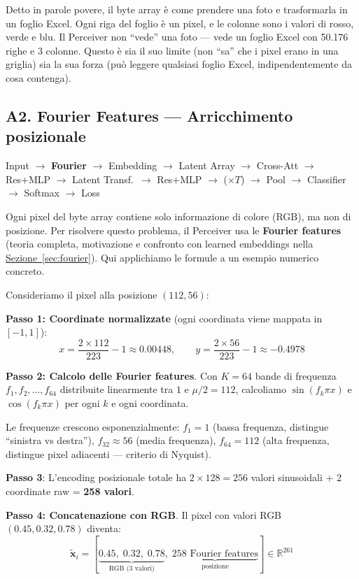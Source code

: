 \documentclass[12pt,a4paper]{article}
\begin{document}
\begin{notabox}
Detto in parole povere, il byte array \`e come prendere una foto e trasformarla in un foglio Excel. Ogni riga del foglio \`e un pixel, e le colonne sono i valori di rosso, verde e blu. Il Perceiver non ``vede'' una foto --- vede un foglio Excel con 50.176 righe e 3 colonne. Questo \`e sia il suo limite (non ``sa'' che i pixel erano in una griglia) sia la sua forza (pu\`o leggere qualsiasi foglio Excel, indipendentemente da cosa contenga).
\end{notabox}


\subsection{A2. Fourier Features --- Arricchimento posizionale} \label{sec:fourier_forward}

\begin{pipelinebox}
Input $\to$ \textbf{Fourier} $\to$ Embedding $\to$ Latent Array $\to$ Cross-Att $\to$ Res+MLP $\to$ Latent Transf.\ $\to$ Res+MLP $\to$ ($\times T$) $\to$ Pool $\to$ Classifier $\to$ Softmax $\to$ Loss
\end{pipelinebox}

Ogni pixel del byte array contiene solo informazione di colore (RGB), ma non di posizione. Per risolvere questo problema, il Perceiver usa le \textbf{Fourier features} (teoria completa, motivazione e confronto con learned embeddings nella \hyperref[sec:fourier]{Sezione~\ref*{sec:fourier}}). Qui applichiamo le formule a un esempio numerico concreto.

\begin{examplebox}
Consideriamo il pixel alla posizione $(112, 56)$:

\textbf{Passo 1: Coordinate normalizzate} (ogni coordinata viene mappata in $[-1, 1]$):
\[
    x = \frac{2 \times 112}{223} - 1 \approx 0.00448, \qquad y = \frac{2 \times 56}{223} - 1 \approx -0.4978
\]

\textbf{Passo 2: Calcolo delle Fourier features}. Con $K = 64$ bande di frequenza $f_1, f_2, \ldots, f_{64}$ distribuite linearmente tra $1$ e $\mu/2 = 112$, calcoliamo $\sin(f_k \pi x)$ e $\cos(f_k \pi x)$ per ogni $k$ e ogni coordinata.

Le frequenze crescono esponenzialmente: $f_1 = 1$ (bassa frequenza, distingue ``sinistra vs destra''), $f_{32} \approx 56$ (media frequenza), $f_{64} = 112$ (alta frequenza, distingue pixel adiacenti --- criterio di Nyquist).

\textbf{Passo 3}: L'encoding posizionale totale ha $2 \times 128 = 256$ valori sinusoidali + 2 coordinate raw = \textbf{258 valori}.

\textbf{Passo 4: Concatenazione con RGB}. Il pixel con valori RGB $(0.45, 0.32, 0.78)$ diventa:
\[
    \tilde{\mathbf{x}}_i = [\underbrace{0.45,\; 0.32,\; 0.78}_{\text{RGB (3 valori)}},\; \underbrace{\text{258 Fourier features}}_{\text{posizione}}] \in \mathbb{R}^{261}
\]
\end{examplebox}
\end{document}
